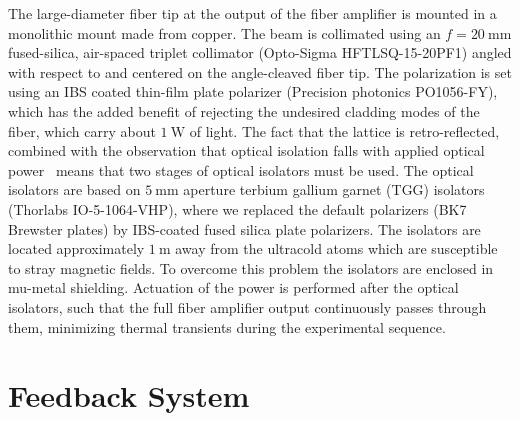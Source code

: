 \documentclass[twocolumn,aps,pra,showpacs,preprintnumbers,bibnotes]{revtex4-1}
\newcommand\unit[2]{\ensuremath{#1~\mathrm{{#2}}}}
\begin{document}
The large-diameter fiber tip at the output of the fiber amplifier is mounted in a monolithic mount made from copper.
The beam is collimated using an $f=\unit{20}{mm}$ fused-silica, air-spaced triplet collimator (Opto-Sigma HFTLSQ-15-20PF1) angled with respect to and centered on the angle-cleaved fiber tip.
The polarization is set using an IBS coated thin-film plate polarizer (Precision photonics PO1056-FY), which has the added benefit of rejecting the undesired cladding modes of the fiber, which carry about \unit{1}{W} of light.
The fact that the lattice is retro-reflected, combined with the observation that optical isolation falls with applied optical power~\cite{Yoshida1999} means that two stages of optical isolators must be used.
The optical isolators are based on \unit{5}{mm} aperture terbium gallium garnet (TGG) isolators (Thorlabs IO-5-1064-VHP), where we replaced the default polarizers (BK7 Brewster plates) by IBS-coated fused silica plate polarizers.
The isolators are located approximately \unit{1}{m} away from the ultracold atoms which are susceptible to stray magnetic fields.
To overcome this problem the isolators are enclosed in mu-metal shielding.
Actuation of the power is performed after the optical isolators, such that the full fiber amplifier output continuously passes through them, minimizing thermal transients during the experimental sequence.

\section{Feedback System}
\end{document}

